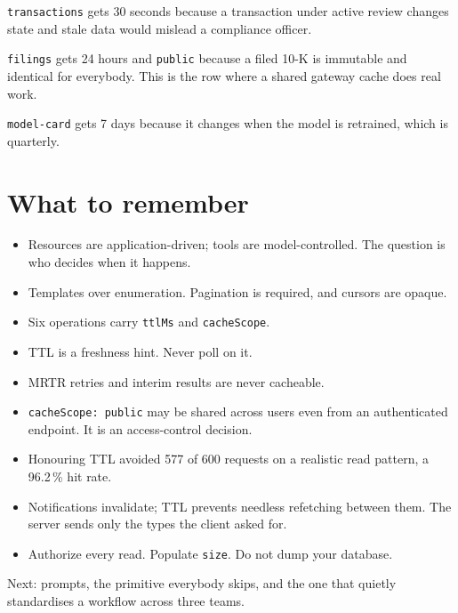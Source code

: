 \texttt{transactions} gets 30 seconds because a transaction under active review
changes state and stale data would mislead a compliance officer.

\texttt{filings} gets 24 hours and \texttt{public} because a filed 10-K is
immutable and identical for everybody. This is the row where a shared gateway
cache does real work.

\texttt{model-card} gets 7 days because it changes when the model is retrained,
which is quarterly.


\section{What to remember}

\begin{itemize}[leftmargin=1.6em, itemsep=3pt]
\item Resources are application-driven; tools are model-controlled. The question
is who decides when it happens.
\item Templates over enumeration. Pagination is required, and cursors are opaque.
\item Six operations carry \texttt{ttlMs} and \texttt{cacheScope}.
\item TTL is a freshness hint. Never poll on it.
\item MRTR retries and interim results are never cacheable.
\item \texttt{cacheScope: public} may be shared across users even from an
authenticated endpoint. It is an access-control decision.
\item Honouring TTL avoided 577 of 600 requests on a realistic read pattern, a
96.2\,\% hit rate.
\item Notifications invalidate; TTL prevents needless refetching between them.
The server sends only the types the client asked for.
\item Authorize every read. Populate \texttt{size}. Do not dump your database.
\end{itemize}

Next: prompts, the primitive everybody skips, and the one that quietly
standardises a workflow across three teams.

